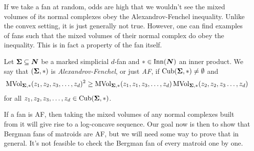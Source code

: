 \documentclass[12pt,oneside]{../../sfsuthesis}
\begin{document}
If we take a fan at random, odds are high that we wouldn't see the mixed volumes of its normal complexes obey the Alexandrov-Fenchel inequality.
Unlike the convex setting, it is just generally not true.
However, one can find examples of fans such that the mixed volumes of their normal complex do obey the inequality.
This is in fact a property of the fan itself.
\begin{definition}\th\label{def:AF}
    Let \( {\bm{\Sigma}} \subseteq \bm{N} \) be a marked simplicial \( d \)-fan and \( \ast \in \operatorname{Inn}(\bm{N}) \) an inner product.
    We say that \( ({\bm{\Sigma}}, \ast) \) is \emph{Alexandrov-Fenchel}, or just \emph{AF}, if \( \operatorname{Cub}({\bm{\Sigma}}, \ast) \neq \emptyset \) and
    \[
        \operatorname{MVol}_{{\bm{\Sigma}}, \ast}(z_1, z_2, z_3, \dots, z_d)^2 \geq  \operatorname{MVol}_{{\bm{\Sigma}}, \ast}(z_1, z_1, z_3, \dots, z_d)\operatorname{MVol}_{{\bm{\Sigma}}, \ast}(z_2, z_2, z_3 \dots, z_d)
    \]
    for all \( z_1, z_2, z_3, \dots, z_d \in \operatorname{Cub}({\bm{\Sigma}}, \ast) \).
\end{definition}
If a fan is AF, then taking the mixed volumes of any normal complexes built from it will give rise to a log-concave sequence.
Our goal now is then to show that Bergman fans of matroids are AF, but we will need some way to prove that in general.
It's not feasible to check the Bergman fan of every matroid one by one.
\end{document}
